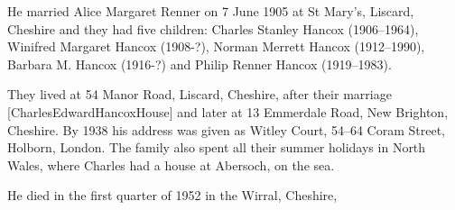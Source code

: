 He married Alice Margaret Renner on 7 June 1905 at St Mary's, Liscard, Cheshire and they had five children:  Charles Stanley Hancox (1906--1964), Winifred Margaret Hancox (1908-?), Norman Merrett Hancox (1912--1990), Barbara M. Hancox (1916-?) and Philip Renner Hancox (1919--1983).

They lived at 54 Manor Road, Liscard, Cheshire, after their marriage [CharlesEdwardHancoxHouse] and later at 13 Emmerdale Road, New Brighton, Cheshire.  By 1938 his address was given as Witley Court, 54--64 Coram Street, Holborn, London.\cite{CharlesEdwardHancoxLondonhouse}  The family also spent all their summer holidays in North Wales, where Charles had a house at Abersoch, on the sea.

He died in the first quarter of 1952 	in the Wirral, Cheshire,

